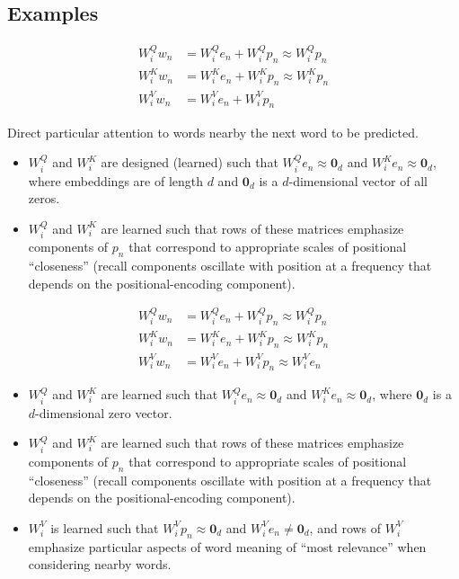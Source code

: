 \documentclass[12pt]{extarticle}
\begin{document}
\subsection{Examples}
\begin{align*}
W_i^Q w_n &= W_i^Q e_n + W_i^Q p_n \approx W_i^Q p_n \\
W_i^K w_n &= W_i^K e_n + W_i^K p_n \approx W_i^K p_n \\
W_i^V w_n &= W_i^V e_n + W_i^V p_n
\end{align*}

Direct particular attention to words nearby the next word to be predicted.

\begin{itemize}
    \item $W_i^Q$ and $W_i^K$ are designed (learned) such that $W_i^Q e_n \approx \mathbf{0}_d$ and $W_i^K e_n \approx \mathbf{0}_d$, where embeddings are of length $d$ and $\mathbf{0}_d$ is a $d$-dimensional vector of all zeros.
    
    \item $W_i^Q$ and $W_i^K$ are learned such that rows of these matrices emphasize components of $p_n$ that correspond to appropriate scales of positional ``closeness'' (recall components oscillate with position at a frequency that depends on the positional-encoding component).
\end{itemize}

\begin{align*}
W_i^Q w_n &= W_i^Q e_n + W_i^Q p_n \approx W_i^Q p_n \\
W_i^K w_n &= W_i^K e_n + W_i^K p_n \approx W_i^K p_n \\
W_i^V w_n &= W_i^V e_n + W_i^V p_n \approx W_i^V e_n
\end{align*}

\begin{itemize}
    \item $W_i^Q$ and $W_i^K$ are learned such that $W_i^Q e_n \approx \mathbf{0}_d$ and $W_i^K e_n \approx \mathbf{0}_d$, where $\mathbf{0}_d$ is a $d$-dimensional zero vector.
    
    \item $W_i^Q$ and $W_i^K$ are learned such that rows of these matrices emphasize components of $p_n$ that correspond to appropriate scales of positional ``closeness'' (recall components oscillate with position at a frequency that depends on the positional-encoding component).
    
    \item $W_i^V$ is learned such that $W_i^V p_n \approx \mathbf{0}_d$ and $W_i^V e_n \neq \mathbf{0}_d$, and rows of $W_i^V$ emphasize particular aspects of word meaning of ``most relevance'' when considering nearby words.
\end{itemize}
\end{document}

